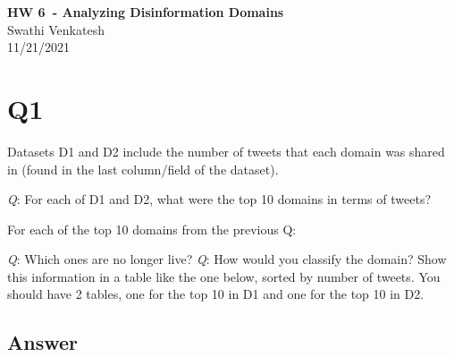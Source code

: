 \documentclass[12pt]{article}
\begin{document}
\begin{centering}
{\large\textbf{HW 6\ - Analyzing Disinformation Domains}}\\ 
Swathi Venkatesh\\
11/21/2021\\
\end{centering}


\section*{Q1}
Datasets D1 and D2 include the number of tweets that each domain was shared in (found in the last column/field of the dataset).

\emph{Q}: For each of D1 and D2, what were the top 10 domains in terms of tweets?

For each of the top 10 domains from the previous Q:

\emph{Q}: Which ones are no longer live?
\emph{Q}: How would you classify the domain?
Show this information in a table like the one below, sorted by number of tweets. You should have 2 tables, one for the top 10 in D1 and one for the top 10 in D2.



\subsection*{Answer}
\end{document}
